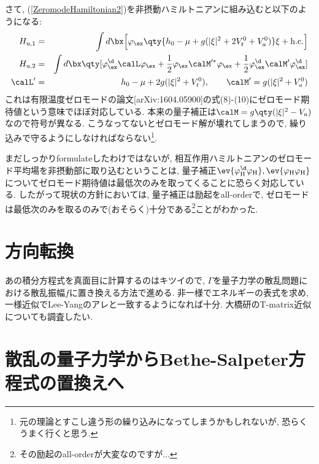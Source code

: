 \documentclass[10.5pt,a4paper]{jreport}
\begin{document}
さて, (\ref{ZeromodeHamiltonian2})を非摂動ハミルトニアンに組み込むと以下のようになる:
\begin{eqnarray}
  H_{\rm u, 1} &=& \int d\bx\Bigl[\varphi_{\ex}\qty{h_0 -\mu + g(|\xi|^2 + 2V_t^0 + V_a^0)}\xi + {\rm h.c.}\Bigr]\\
  H_{\rm u, 2} &=& \int d\bx\qty[\varphi_{\ex}^\d\calL\varphi_{\ex} + \frac12\varphi_{\ex}\calM'^{*}\varphi_{\ex} + \frac12\varphi_{\ex}^\d\calM'\varphi_{\ex}^\d]\\
  \calL' &=& h_0 - \mu +2g(|\xi|^2 + V_t^0),\hspace{0.7cm}\calM' = g(|\xi|^2 + V_a^0)
\end{eqnarray}
これは有限温度ゼロモードの論文[arXiv:1604.05900]の式(8)-(10)にゼロモード期待値という意味でほぼ対応している. 本来の量子補正は$\calM = g\qty(|\xi|^2 - V_a)$なので符号が異なる. こうなってないとゼロモード解が壊れてしまうので, 繰り込みで守るようにしなければならない\footnote{元の理論とすこし違う形の繰り込みになってしまうかもしれないが, 恐らくうまく行くと思う. }. 

まだしっかりformulateしたわけではないが, 相互作用ハミルトニアンのゼロモード平均場を非摂動部に取り込むということは, 量子補正$\ev{\varphi^\d_{\rm H}\varphi_{\rm H}}, \ev{\varphi_{\rm H}\varphi_{\rm H}}$についてゼロモード期待値は最低次のみを取ってくることに恐らく対応している. したがって現状の方針においては, 量子補正は励起をall-orderで, ゼロモードは最低次のみを取るのみで(おそらく)十分である\footnote{その励起のall-orderが大変なのですが...}ことがわかった.
\section{方向転換}
あの積分方程式を真面目に計算するのはキツイので, $\Gamma$を量子力学の散乱問題における散乱振幅$f$に置き換える方法で進める. 非一様でエネルギーの表式を求め, 一様近似でLee-Yangのアレと一致するようになれば十分. 大橋研のT-matrix近似についても調査したい.
\section{散乱の量子力学からBethe-Salpeter方程式の置換えへ}
\end{document}
